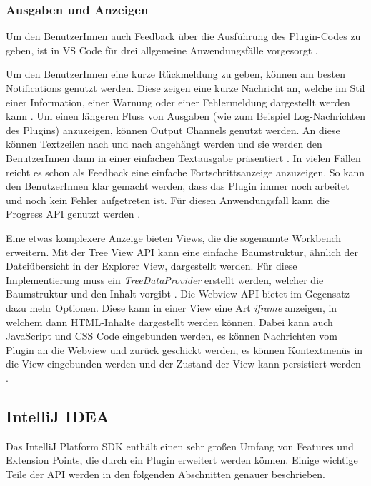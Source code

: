 \subsubsection{Ausgaben und Anzeigen}
  Um den BenutzerInnen auch Feedback über die Ausführung des Plugin-Codes zu geben, 
  ist in VS Code für drei allgemeine Anwendungsfälle vorgesorgt 
  \cite{VSCodeExtensionAPICommonCapabilities}. 
  
  Um den BenutzerInnen eine kurze 
  Rückmeldung zu geben, können am besten Notifications genutzt werden. Diese zeigen eine kurze 
  Nachricht an, welche im Stil einer Information, einer Warnung oder einer Fehlermeldung 
  dargestellt werden kann \cite{VSCodeExtensionAPINotifications}. 
  Um einen längeren Fluss von Ausgaben (wie zum Beispiel Log-Nachrichten 
  des Plugins) anzuzeigen, können Output Channels genutzt werden. An diese können Textzeilen nach 
  und nach angehängt werden und sie werden den BenutzerInnen dann in einer einfachen Textausgabe präsentiert
  \cite{VSCodeExtensionAPIOutputChannel}. 
  In vielen Fällen reicht es schon als Feedback eine einfache Fortschrittsanzeige anzuzeigen. So kann den 
  BenutzerInnen klar gemacht werden, dass das Plugin immer noch arbeitet und noch kein Fehler aufgetreten 
  ist. Für diesen Anwendungsfall kann die Progress API genutzt werden
  \cite{VSCodeExtensionAPIProgress}.

  Eine etwas komplexere Anzeige bieten Views, die die sogenannte Workbench erweitern.
  Mit der Tree View API kann eine einfache Baumstruktur, ähnlich der 
  Dateiübersicht in der Explorer View, dargestellt werden. Für diese Implementierung
  muss ein \emph{TreeDataProvider} erstellt werden, welcher die Baumstruktur und
  den Inhalt vorgibt \cite{VSCodeExtensionAPITreeViewAPI}. 
  Die Webview API bietet im Gegensatz dazu mehr
  Optionen. Diese kann in einer View eine Art \emph{iframe} anzeigen, in welchem
  dann HTML-Inhalte dargestellt werden können. Dabei kann auch JavaScript und CSS Code eingebunden
  werden, es können Nachrichten vom Plugin an die Webview und zurück geschickt werden, 
  es können Kontextmenüs in die View eingebunden werden und der Zustand der View
  kann persistiert werden \cite{VSCodeExtensionAPIWebviewAPI}.

\subsection{IntelliJ IDEA}

Das IntelliJ Platform SDK enthält einen sehr großen Umfang von Features und Extension Points,
die durch ein Plugin erweitert werden können. Einige wichtige Teile der API werden in den 
folgenden Abschnitten genauer beschrieben.


